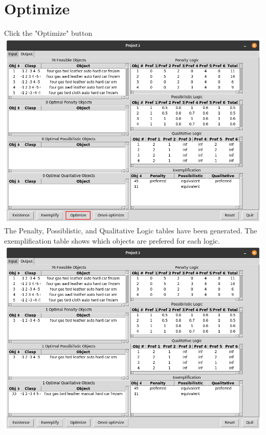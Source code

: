 \documentclass[12pt]{report}
\begin{document}
\section{Optimize} Click the "Optimize" button\\
\includegraphics[scale=0.3]{optimize}\\
The Penalty, Possiblistic, and Qualitative Logic tables have been generated. The exemplification table shows which objects are prefered for each logic.\\
\includegraphics[scale=0.3]{post_optimize}
\newpage
\end{document}
